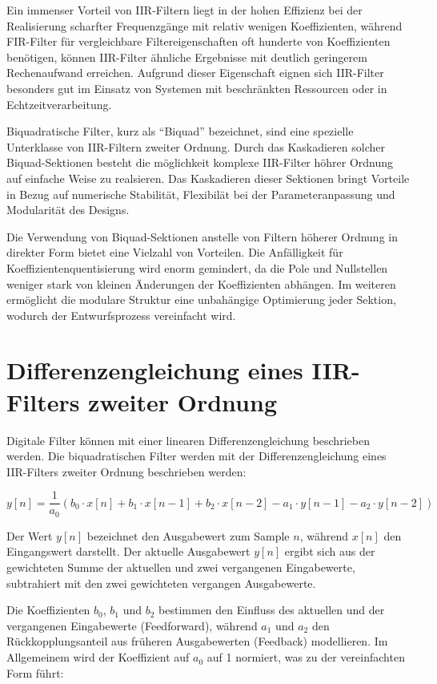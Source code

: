 \documentclass[
  ngerman,
  letterpaper,
  DIV=11]{scrreprt}
\begin{document}
Ein immenser Vorteil von IIR-Filtern liegt in der hohen Effizienz bei
der Realisierung scharfter Frequenzgänge mit relativ wenigen
Koeffizienten, während FIR-Filter für vergleichbare Filtereigenschaften
oft hunderte von Koeffizienten benötigen, können IIR-Filter ähnliche
Ergebnisse mit deutlich geringerem Rechenaufwand erreichen. Aufgrund
dieser Eigenschaft eignen sich IIR-Filter besonders gut im Einsatz von
Systemen mit beschränkten Ressourcen oder in Echtzeitverarbeitung.

Biquadratische Filter, kurz als ``Biquad'' bezeichnet, sind eine
spezielle Unterklasse von IIR-Filtern zweiter Ordnung. Durch das
Kaskadieren solcher Biquad-Sektionen besteht die möglichkeit komplexe
IIR-Filter höhrer Ordnung auf einfache Weise zu realsieren. Das
Kaskadieren dieser Sektionen bringt Vorteile in Bezug auf numerische
Stabilität, Flexibilät bei der Parameteranpassung und Modularität des
Designs.

Die Verwendung von Biquad-Sektionen anstelle von Filtern höherer Ordnung
in direkter Form bietet eine Vielzahl von Vorteilen. Die Anfälligkeit
für Koeffizientenquentisierung wird enorm gemindert, da die Pole und
Nullstellen weniger stark von kleinen Änderungen der Koeffizienten
abhängen. Im weiteren ermöglicht die modulare Struktur eine unbahängige
Optimierung jeder Sektion, wodurch der Entwurfsprozess vereinfacht wird.

\section{Differenzengleichung eines IIR-Filters zweiter
Ordnung}\label{differenzengleichung-eines-iir-filters-zweiter-ordnung}

Digitale Filter können mit einer linearen Differenzengleichung
beschrieben werden. Die biquadratischen Filter werden mit der
Differenzengleichung eines IIR-Filters zweiter Ordnung beschrieben
werden:

\[
y[n] =  \frac{1}{a_0}(b_0 \cdot x[n] + b_1 \cdot x[n - 1] + b_2 \cdot x[n - 2] - a_1 \cdot y[n - 1] - a_2 \cdot y[n - 2])
\]

Der Wert \(y[n]\) bezeichnet den Ausgabewert zum Sample \(n\), während
\(x[n]\) den Eingangswert darstellt. Der aktuelle Ausgabewert \(y[n]\)
ergibt sich aus der gewichteten Summe der aktuellen und zwei vergangenen
Eingabewerte, subtrahiert mit den zwei gewichteten vergangen
Ausgabewerte.

Die Koeffizienten \(b_0\), \(b_1\) und \(b_2\) bestimmen den Einfluss
des aktuellen und der vergangenen Eingabewerte (Feedforward), während
\(a_1\) und \(a_2\) den Rückkopplungsanteil aus früheren Ausgabewerten
(Feedback) modellieren. Im Allgemeinem wird der Koeffizient auf \(a_0\)
auf 1 normiert, was zu der vereinfachten Form führt:
\end{document}
